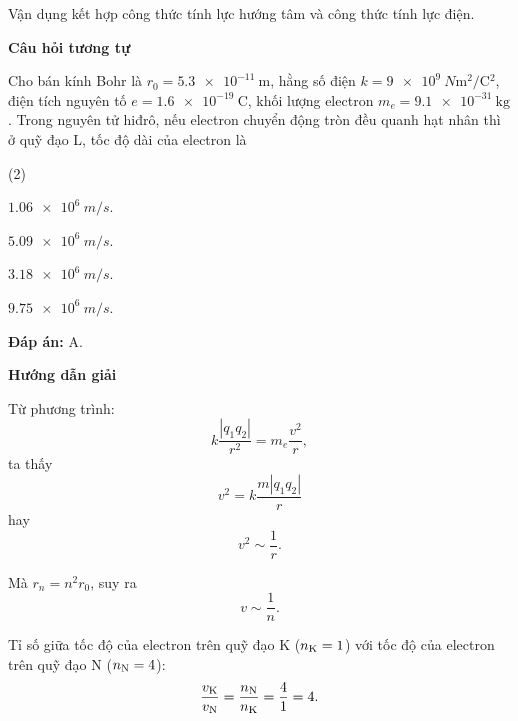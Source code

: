 \begin{dang}{Vận dụng kết hợp công thức tính lực hướng tâm và công thức tính lực điện.}
{	\begin{center}
		\textbf{Câu hỏi tương tự}
	\end{center}
	
Cho bán kính Bohr là $r_0=\SI{5.3e-11}{\meter}$, hằng số điện $k=\SI{9e9}{N \meter ^2 / \coulomb ^2}$, điện tích nguyên tố $e=\SI{1.6e-19}{\coulomb}$, khối lượng electron $m_e=\SI{9.1e-31}{\kilogram}$. Trong nguyên tử hiđrô, nếu electron chuyển động tròn đều quanh hạt nhân thì ở quỹ đạo L, tốc độ dài của electron là
	\begin{mcq}(2)
		\item $ \SI{1,06 e6}{m/s} $.
		\item $ \SI{5,09 e6}{m/s} $.
		\item $ \SI{3,18 e6}{m/s} $.
		\item $ \SI{9,75 e6}{m/s} $.
	\end{mcq}	
	
	\textbf{Đáp án:} A.}
	
{	\begin{center}
		\textbf{Hướng dẫn giải}
	\end{center}

	Từ phương trình:
	\begin{equation*}
		k \dfrac {|q_1q_2|}{r^2} = m_e \dfrac{v^2}{r},
	\end{equation*}
	ta thấy
	\begin{equation*}
		v^2 = k\dfrac{m|q_1q_2|}{r}
	\end{equation*}
	hay
	\begin{equation*}
		v^2 \sim \dfrac{1}{r}.
	\end{equation*}
	
	Mà $r_n =n ^2 r_0$, suy ra
	\begin{equation*}
		v \sim \dfrac{1}{n}.
	\end{equation*}
	
	Tỉ số giữa tốc độ của electron trên quỹ đạo K ($n_\text K = 1$) với tốc độ của electron trên quỹ đạo N ($n_\text N= 4$):
	\begin{equation*}
		\dfrac{v_\text K}{v_\text N} = \dfrac{n_\text N}{n_\text K}=\dfrac{4}{1}=4.
	\end{equation*}
	
}
\end{dang}
